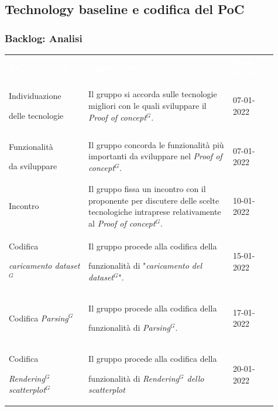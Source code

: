 \subsection{Technology baseline e codifica del PoC}
\subsubsection{Backlog: Analisi}
{\renewcommand{\arraystretch}{1.5}
\begin{longtable}{p{0.27\linewidth}p{0.49\linewidth}p{0.15\linewidth}}
	\rowcolor[RGB]{33, 73, 50}
	\textcolor{white}{\textbf{Titolo attività}} & \textcolor{white}{\textbf{Descrizione}} & \textcolor{white}{\textbf{Data inizio}}\\
    
    \rowcolor[RGB]{216, 235, 171}
    Individuazione \par delle tecnologie & Il gruppo si accorda sulle tecnologie migliori con le quali sviluppare il \textit{Proof of concept$^{G}$}. & 07-01-2022\\

    \rowcolor[RGB]{233, 245, 206}
    Funzionalità \par da sviluppare & Il gruppo concorda le funzionalità più importanti da sviluppare nel \textit{Proof of concept$^{G}$}. & 07-01-2022\\

    \rowcolor[RGB]{216, 235, 171}
    Incontro & Il gruppo fissa un incontro con il proponente per discutere delle scelte tecnologiche intraprese relativamente al \textit{Proof of concept$^{G}$}. & 10-01-2022\\

    \rowcolor[RGB]{233, 245, 206}
    Codifica \par \textit{caricamento dataset$^{G}$} & Il gruppo procede alla codifica della \par funzionalità di "\textit{caricamento del dataset$^{G}$}". & 15-01-2022\\

    \rowcolor[RGB]{216, 235, 171}
    Codifica \textit{Parsing$^{G}$} & Il gruppo procede alla codifica della \par funzionalità di \textit{Parsing$^{G}$}. & 17-01-2022\\

    \rowcolor[RGB]{233, 245, 206}
    Codifica \par \textit{Rendering$^{G}$ scatterplot$^{G}$} & Il gruppo procede alla codifica della \par funzionalità di \textit{Rendering$^{G}$ dello scatterplot} & 20-01-2022\\


\end{longtable}}
